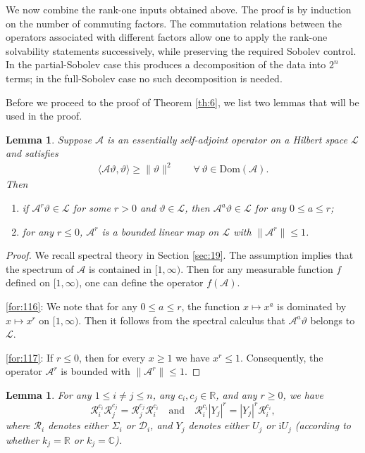 \documentclass[11 pt]{amsart}
\newcommand{\RR}{\mathbb{R}}
\newcommand{\CC}{\mathbb{C}}
\newcommand{\norm}[1]{\lVert#1\rVert}
\newtheorem{lemma}[theorem]{Lemma}
\theoremstyle{definition}
\numberwithin{equation}{section}
\begin{document}
We now combine the rank-one inputs obtained above. The proof is by induction
on the number of commuting factors. The commutation relations between the
operators associated with different factors allow one to apply the rank-one
solvability statements successively, while preserving the required Sobolev
control. In the partial-Sobolev case this produces a decomposition of the data
into $2^n$ terms; in the full-Sobolev case no such decomposition is needed.

Before we proceed to the proof of Theorem \ref{th:6}, we list two lemmas that will be used in the proof.
\begin{lemma}\label{ob:1} Suppose $\mathcal{A}$ is an essentially self-adjoint operator on a Hilbert space $\mathcal{L}$ and satisfies
\begin{align}\label{for:264}
 \langle \mathcal{A}\vartheta, \vartheta\rangle \geq\norm{\vartheta}^2\qquad \forall\, \vartheta\in \text{Dom}(\mathcal{A}).
\end{align} Then
\begin{enumerate}
  \item\label{for:116} if $\mathcal{A}^r\vartheta\in \mathcal{L}$ for some $r>0$ and $\vartheta\in \mathcal{L}$, then $\mathcal{A}^a\vartheta\in \mathcal{L}$ for any $0\leq a\leq r$;

  \smallskip
  \item\label{for:117} for any $r\leq 0$,  $\mathcal{A}^r$ is a bounded linear map on $\mathcal{L}$ with $\norm{\mathcal{A}^r}\leq 1$.
\end{enumerate}
\end{lemma}
\begin{proof} We recall spectral theory in Section \ref{sec:19}. The assumption implies that the spectrum of \(\mathcal{A}\) is contained in \([1,\infty)\). Then for any measurable function \(f\) defined on \([1,\infty)\), one can define the operator \(f(\mathcal{A})\).

\eqref{for:116}:  We note that for any \(0\leq a\leq r\), the function \(x\mapsto x^a\) is dominated by \(x\mapsto x^r\) on \([1,\infty)\).
Then  it follows from the spectral calculus that \(\mathcal{A}^a\vartheta\) belongs to \(\mathcal{L}\).

\eqref{for:117}: If \(r\leq 0\), then for every \(x\geq 1\) we have \(x^r\leq 1\). Consequently, the operator \(\mathcal{A}^r\) is bounded with \(\|\mathcal{A}^r\|\leq 1\).


\end{proof}

\begin{lemma}\label{ob:2}
For any $1\leq i\neq j\leq n$, any $c_i,c_j\in\RR$, and any $r\ge0$, we have
\[
 \mathcal{R}_{i}^{c_i} \mathcal{R}_{j}^{c_j}=\mathcal{R}_{j}^{c_j} \mathcal{R}_{i}^{c_i}
  \quad\text{and}\quad
  \mathcal{R}_{i}^{c_i}|Y_j|^r=|Y_j|^r\mathcal{R}_{i}^{c_i},
\]
where $\mathcal{R}_i$ denotes either $\Sigma_i$ or $\mathcal{D}_i$, and $Y_j$ denotes either $U_j$ or $\mathrm{i}U_j$ (according to whether
$k_j=\RR$ or $k_j=\CC$).
\end{lemma}
\end{document}
